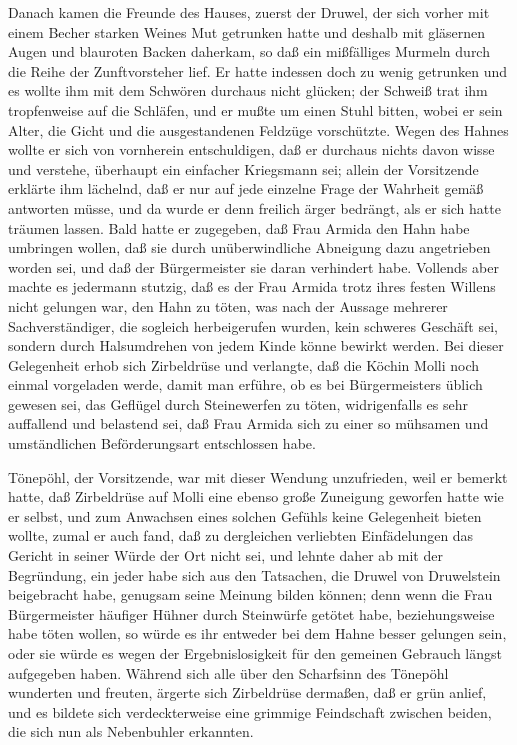 Danach kamen die Freunde des Hauses, zuerst der Druwel, der sich
vorher mit einem Becher starken Weines Mut getrunken hatte und
deshalb mit gläsernen Augen und blauroten Backen daherkam, so daß
ein mißfälliges Murmeln durch die Reihe der Zunftvorsteher lief. Er
hatte indessen doch zu wenig getrunken und es wollte ihm mit dem
Schwören durchaus nicht glücken; der Schweiß trat ihm tropfenweise
auf die Schläfen, und er mußte um einen Stuhl bitten, wobei er sein
Alter, die Gicht und die ausgestandenen Feldzüge vorschützte. Wegen
des Hahnes wollte er sich von vornherein entschuldigen, daß er
durchaus nichts davon wisse und verstehe, überhaupt ein einfacher
Kriegsmann sei; allein der Vorsitzende erklärte ihm lächelnd, daß
er nur auf jede einzelne Frage der Wahrheit gemäß antworten müsse,
und da wurde er denn freilich ärger bedrängt, als er sich hatte
träumen lassen. Bald hatte er zugegeben, daß Frau Armida den Hahn
habe umbringen wollen, daß sie \pagenum{[30]} durch unüberwindliche
Abneigung dazu angetrieben worden sei, und daß der Bürgermeister
sie daran verhindert habe. Vollends aber machte es jedermann
stutzig, daß es der Frau Armida trotz ihres festen Willens nicht
gelungen war, den Hahn zu töten, was nach der Aussage mehrerer
Sachverständiger, die sogleich herbeigerufen wurden, kein schweres
Geschäft sei, sondern durch Halsumdrehen von jedem Kinde könne
bewirkt werden. Bei dieser Gelegenheit erhob sich Zirbeldrüse und
verlangte, daß die Köchin Molli noch einmal vorgeladen werde, damit
man erführe, ob es bei Bürgermeisters üblich gewesen sei, das
Geflügel durch Steinewerfen zu töten, widrigenfalls es sehr
auffallend und belastend sei, daß Frau Armida sich zu einer so
mühsamen und umständlichen Beförderungsart entschlossen habe.

Tönepöhl, der Vorsitzende, war mit dieser Wendung unzufrieden, weil
er bemerkt hatte, daß Zirbeldrüse auf Molli eine ebenso große
Zuneigung geworfen hatte wie er selbst, und zum Anwachsen eines
solchen Gefühls keine Gelegenheit bieten wollte, zumal er auch
fand, daß zu dergleichen verliebten Einfädelungen das Gericht in
seiner Würde der Ort nicht sei, und lehnte daher ab mit der
Begründung, ein jeder habe sich aus den Tatsachen, die Druwel von
Druwelstein beigebracht habe, genugsam seine Meinung bilden können;
denn wenn die Frau Bürgermeister häufiger Hühner durch Steinwürfe
getötet habe, beziehungsweise habe töten wollen, so würde es ihr
entweder bei dem Hahne besser gelungen sein, oder sie würde es
wegen der Ergebnislosigkeit für den gemeinen Gebrauch längst
aufgegeben haben. Während sich alle über den Scharfsinn des
Tönepöhl wunderten und freuten, ärgerte sich Zirbeldrüse dermaßen,
daß er grün anlief, und es bildete sich verdeckterweise eine
grimmige \pagenum{[31]} Feindschaft zwischen beiden, die sich nun
als Nebenbuhler erkannten.

